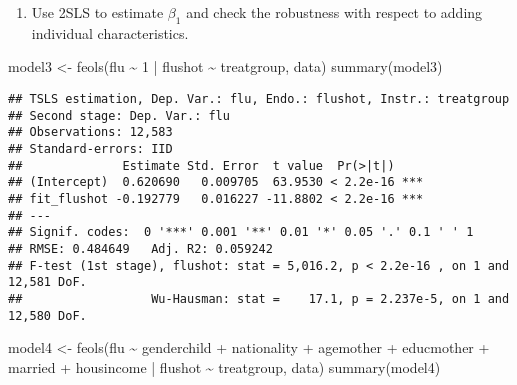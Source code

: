 \documentclass[
]{article}
\newenvironment{Shaded}{\begin{snugshade}}{\end{snugshade}}
\newcommand{\DecValTok}[1]{\textcolor[rgb]{0.00,0.00,0.81}{#1}}
\newcommand{\FunctionTok}[1]{\textcolor[rgb]{0.00,0.00,0.00}{#1}}
\newcommand{\NormalTok}[1]{#1}
\newcommand{\OtherTok}[1]{\textcolor[rgb]{0.56,0.35,0.01}{#1}}
\newcommand{\SpecialCharTok}[1]{\textcolor[rgb]{0.00,0.00,0.00}{#1}}
\providecommand{\tightlist}{%
  \setlength{\itemsep}{0pt}\setlength{\parskip}{0pt}}
\begin{document}
\begin{enumerate}
\def\labelenumi{\alph{enumi})}
\setcounter{enumi}{4}
\tightlist
\item
  Use 2SLS to estimate \(\beta_1\) and check the robustness with respect
  to adding individual characteristics.
\end{enumerate}

\begin{Shaded}
\begin{Highlighting}[]
\NormalTok{model3 }\OtherTok{\textless{}{-}} \FunctionTok{feols}\NormalTok{(flu }\SpecialCharTok{\textasciitilde{}} \DecValTok{1} \SpecialCharTok{|}\NormalTok{ flushot }\SpecialCharTok{\textasciitilde{}}\NormalTok{ treatgroup, data)}
\FunctionTok{summary}\NormalTok{(model3)}
\end{Highlighting}
\end{Shaded}

\begin{verbatim}
## TSLS estimation, Dep. Var.: flu, Endo.: flushot, Instr.: treatgroup
## Second stage: Dep. Var.: flu
## Observations: 12,583 
## Standard-errors: IID 
##              Estimate Std. Error  t value  Pr(>|t|)    
## (Intercept)  0.620690   0.009705  63.9530 < 2.2e-16 ***
## fit_flushot -0.192779   0.016227 -11.8802 < 2.2e-16 ***
## ---
## Signif. codes:  0 '***' 0.001 '**' 0.01 '*' 0.05 '.' 0.1 ' ' 1
## RMSE: 0.484649   Adj. R2: 0.059242
## F-test (1st stage), flushot: stat = 5,016.2, p < 2.2e-16 , on 1 and 12,581 DoF.
##                  Wu-Hausman: stat =    17.1, p = 2.237e-5, on 1 and 12,580 DoF.
\end{verbatim}

\begin{Shaded}
\begin{Highlighting}[]
\NormalTok{model4 }\OtherTok{\textless{}{-}} \FunctionTok{feols}\NormalTok{(flu }\SpecialCharTok{\textasciitilde{}}\NormalTok{ genderchild }\SpecialCharTok{+}\NormalTok{ nationality }\SpecialCharTok{+}\NormalTok{ agemother }\SpecialCharTok{+}\NormalTok{ educmother }\SpecialCharTok{+}\NormalTok{ married }
                \SpecialCharTok{+}\NormalTok{ housincome }\SpecialCharTok{|}\NormalTok{ flushot }\SpecialCharTok{\textasciitilde{}}\NormalTok{ treatgroup, data)}
\FunctionTok{summary}\NormalTok{(model4)}
\end{Highlighting}
\end{Shaded}
\end{document}
